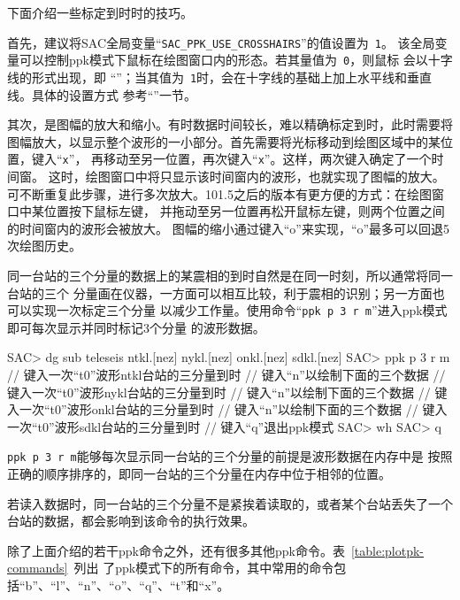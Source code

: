 下面介绍一些标定到时时的技巧。

首先，建议将SAC全局变量``\verb+SAC_PPK_USE_CROSSHAIRS+''的值设置为~\verb+1+。
该全局变量可以控制ppk模式下鼠标在绘图窗口内的形态。若其量值为~\verb+0+，则鼠标
会以十字线的形式出现，即
``''；当其值为~\verb+1+时，会在十字线的基础上加上水平线和垂直线。具体的设置方式
参考``''一节。

其次，是图幅的放大和缩小。有时数据时间较长，难以精确标定到时，此时需要将图幅放大，以显示整个波形的一小部分。首先需要将光标移动到绘图区域中的某位置，键入``\verb+x+''，
再移动至另一位置，再次键入``\verb+x+''。这样，两次键入确定了一个时间窗。
这时，绘图窗口中将只显示该时间窗内的波形，也就实现了图幅的放大。
可不断重复此步骤，进行多次放大。101.5之后的版本有更方便的方式：在绘图窗口中某位置按下鼠标左键，
并拖动至另一位置再松开鼠标左键，则两个位置之间的时间窗内的波形会被放大。
图幅的缩小通过键入``o''来实现，``o''最多可以回退5次绘图历史。

同一台站的三个分量的数据上的某震相的到时自然是在同一时刻，所以通常将同一台站的三个
分量画在仪器，一方面可以相互比较，利于震相的识别；另一方面也可以实现一次标定三个分量
以减少工作量。使用命令``\verb+ppk p 3 r m+''进入ppk模式即可每次显示并同时标记3个分量
的波形数据。

\begin{SACCode}
SAC> dg sub teleseis ntkl.[nez] nykl.[nez] onkl.[nez] sdkl.[nez]
SAC> ppk p 3 r m
// 键入一次``t0''波形ntkl台站的三分量到时
// 键入``n''以绘制下面的三个数据
// 键入一次``t0''波形nykl台站的三分量到时
// 键入``n''以绘制下面的三个数据
// 键入一次``t0''波形onkl台站的三分量到时
// 键入``n''以绘制下面的三个数据
// 键入一次``t0''波形sdkl台站的三分量到时
// 键入``q''退出ppk模式
SAC> wh
SAC> q
\end{SACCode}
\begin{note}
\verb+ppk p 3 r m+能够每次显示同一台站的三个分量的前提是波形数据在内存中是
按照正确的顺序排序的，即同一台站的三个分量在内存中位于相邻的位置。

若读入数据时，同一台站的三个分量不是紧挨着读取的，或者某个台站丢失了一个
台站的数据，都会影响到该命令的执行效果。
\end{note}

除了上面介绍的若干ppk命令之外，还有很多其他ppk命令。表~\ref{table:plotpk-commands}~列出
了ppk模式下的所有命令，其中常用的命令包括``b''、``l''、``n''、``o''、``q''、``t''和``x''。

